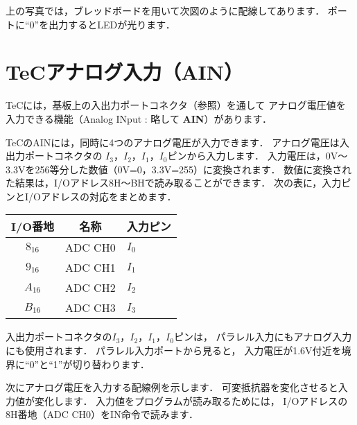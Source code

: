 \begin{center}
\end{center}

上の写真では，ブレッドボードを用いて次図のように配線してあります．
ポートに``0''を出力するとLEDが光ります．

\begin{center}
\end{center}

\newpage
\section{TeCアナログ入力（AIN）}
\label{ain}

TeCには，基板上の入出力ポートコネクタ（参照）を通して
アナログ電圧値を入力できる機能（Analog INput : 略して {\bf AIN}）があります．

TeCのAINには，同時に4つのアナログ電圧が入力できます．
アナログ電圧は入出力ポートコネクタの
$I_3$，$I_2$，$I_1$，$I_0$ピンから入力します．
入力電圧は，0V〜3.3Vを256等分した数値（0V=0，3.3V=255）に変換されます．
数値に変換された結果は，I/Oアドレス8H〜BHで読み取ることができます．
次の表に，入力ピンとI/Oアドレスの対応をまとめます．

{\footnotesize\begin{center}
\begin{tabular}{c|l|l}
\hline
\hline
I/O番地 & \multicolumn{1}{|c|}{名称} & \multicolumn{1}{|c}{入力ピン} \\
\hline
$8_{16}$ & ADC CH0  & $I_0$ \\
$9_{16}$ & ADC CH1  & $I_1$ \\
$A_{16}$ & ADC CH2  & $I_2$ \\
$B_{16}$ & ADC CH3  & $I_3$ \\
\end{tabular}
\end{center}}

入出力ポートコネクタの$I_3$，$I_2$，$I_1$，$I_0$ピンは，
パラレル入力にもアナログ入力にも使用されます．
パラレル入力ポートから見ると，
入力電圧が1.6V付近を境界に``0''と``1''が切り替わります．

次にアナログ電圧を入力する配線例を示します．
可変抵抗器を変化させると入力値が変化します．
入力値をプログラムが読み取るためには，
I/Oアドレスの8H番地（ADC CH0）をIN命令で読みます．

\begin{center}
\end{center}

